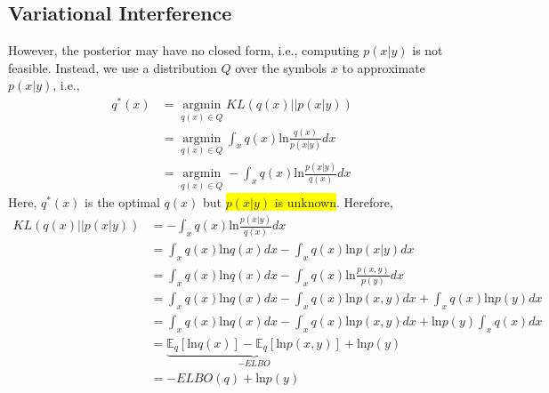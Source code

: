 \documentclass{article}
\begin{document}
\subsection{Variational Interference}
However, the posterior may have no closed form, i.e., computing $p(x|y)$ is not feasible. Instead, we use a distribution $Q$ over the symbols $x$ to approximate $p(x|y)$, i.e.,
\begin{equation}
\begin{split}
q^*(x) &= \mathop{\arg\min}\limits_{q(x)\in Q} KL(q(x) || p(x|y)) \\
&= \mathop{\arg\min}\limits_{q(x)\in Q} \int_{x}q(x)\text{ln} \frac{q(x)}{p(x|y)}dx \\
&= \mathop{\arg\min}\limits_{q(x)\in Q} -\int_{x}q(x)\text{ln} \frac{p(x|y)}{q(x)}dx
\end{split}
\end{equation}
Here, $q^*(x)$ is the optimal $q(x)$ but \colorbox{yellow}{$p(x|y)$ is unknown}. Herefore,
\begin{align}
KL(q(x) || p(x|y)) &= -\int_{x}q(x)\text{ln} \frac{p(x|y)}{q(x)}dx \\
&= \int_{x}q(x)\text{ln} q(x)dx - \int_{x}q(x)\text{ln}  p(x|y)dx \\ 
&= \int_{x}q(x)\text{ln} q(x)dx - \int_{x}q(x)\text{ln}  \frac{p(x,y)}{p(y)}dx \\ 
&= \int_{x}q(x)\text{ln} q(x)dx - \int_{x}q(x)\text{ln}p(x,y)dx + \int_{x}q(x)\text{ln}p(y)dx \\ 
&= \int_{x}q(x)\text{ln} q(x)dx - \int_{x}q(x)\text{ln}p(x,y)dx + \text{ln}p(y)\int_{x}q(x)dx \\ 
&= \underbrace{\mathbb{E}_q [\text{ln} q(x)] - \mathbb{E}_q[\text{ln}p(x,y)]}_{-ELBO} + \text{ln}p(y) \\
&= -ELBO(q) + \text{ln}p(y)
\label{eq:vb-vi-kl}
\end{align}
\end{document}

